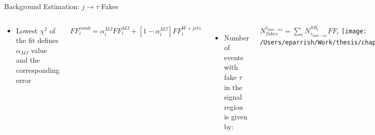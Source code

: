 \documentclass[aspectratio=169,xcolor=table]{beamer}
\begin{document}
\begin{frame}[t]{Background Estimation: $j \rightarrow \tau$ Fakes}
\begin{columns}[t]
\begin{itemize}
\begin{itemize}
            \item Lowest $\chi^2$ of the fit defines $\alpha_{MJ}$ value and the corresponding error
          \end{itemize}
        \end{itemize}
            \centering
            \footnotesize
            $FF^{comb}_{i}=\alpha^{MJ}_{i} FF^{MJ}_{i} + [1-\alpha^{MJ}_{i}]FF^{W+jets}_{i}$
          \begin{itemize}
          \item Number of events with fake $\tau$ in the signal region is given by:
        \end{itemize}
          \centering
          \footnotesize
          $N^{\tau_{had-vis}}_{fakes} = \sum\limits_{i} N^{SR_{i}}_{\bar{\tau}_{had-vis}} FF_{i}$
      \centering
      \texttt{[image: /Users/eparrish/Work/thesis/chapters/chapter6\_HPlus/images/FFs/FFs\_FIT\_SR\_TAUJET\_1\_40\_45.png]}
        \begin{itemize}
          \tiny
          \item $\bar{\tau_{0}}$ jet width used in $\alpha$ fitting of 1-prong and 3-prong $\bar{\tau}$
        \end{itemize}
         \begin{table}
          \end{table}
      \end{columns}
    \end{frame}
\end{document}
